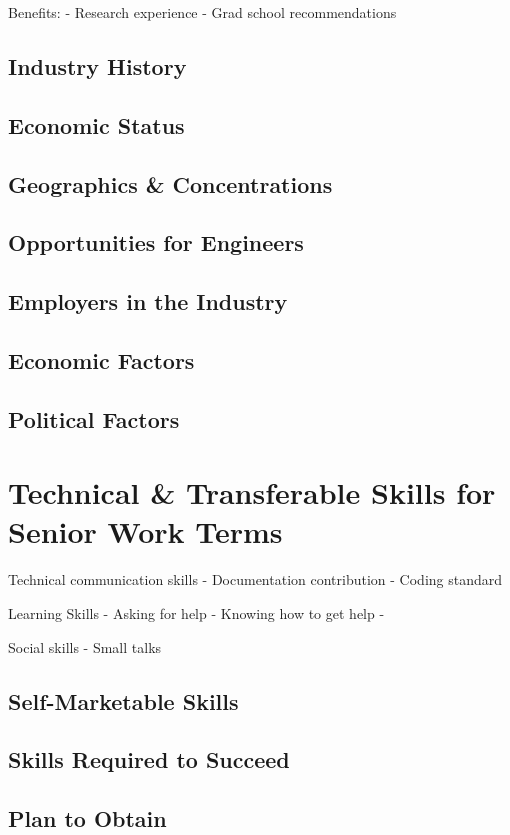 \documentclass[10pt,letterpaper]{article}
\begin{document}
Benefits:
- Research experience
- Grad school recommendations

\subsection{Industry History}
\subsection{Economic Status}
\subsection{Geographics \& Concentrations}
\subsection{Opportunities for Engineers}
\subsection{Employers in the Industry}
\subsection{Economic Factors}
\subsection{Political Factors}

\section{Technical \& Transferable Skills for Senior Work Terms}\label{transferable-skills}

Technical communication skills
- Documentation contribution
- Coding standard

Learning Skills
- Asking for help
- Knowing how to get help
-

Social skills
- Small talks

\subsection{Self-Marketable Skills}

\subsection{Skills Required to Succeed}

\subsection{Plan to Obtain}
\end{document}
